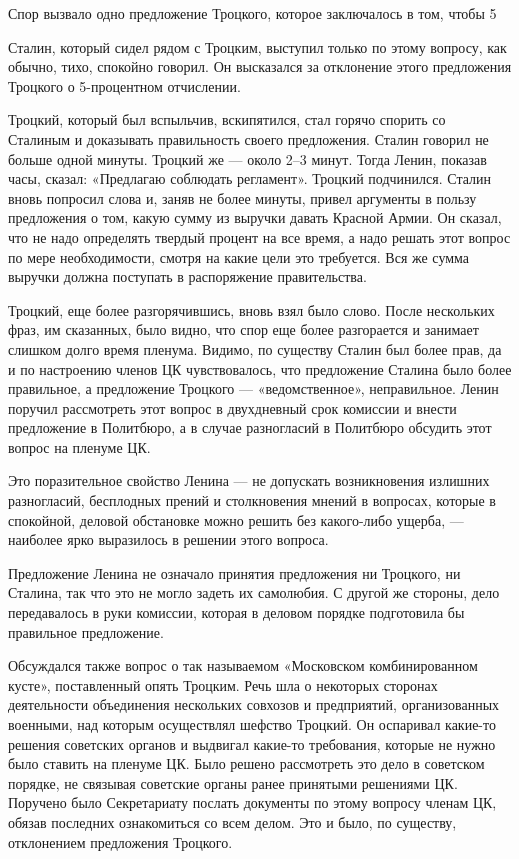 \documentclass[12pt, a4paper, openany]{book}
\begin{document}
Спор вызвало одно предложение Троцкого, которое заключалось в том, чтобы 5 %

Сталин, который сидел рядом с Троцким, выступил только по этому вопросу, как обычно, тихо, спокойно говорил. Он высказался за отклонение этого предложения Троцкого о 5-процентном отчислении.

Троцкий, который был вспыльчив, вскипятился, стал горячо спорить со Сталиным и доказывать правильность своего предложения. Сталин говорил не больше одной минуты. Троцкий же — около 2–3 минут. Тогда Ленин, показав часы, сказал: «Предлагаю соблюдать регламент». Троцкий подчинился. Сталин вновь попросил слова и, заняв не более минуты, привел аргументы в пользу предложения о том, какую сумму из выручки давать Красной Армии. Он сказал, что не надо определять твердый процент на все время, а надо решать этот вопрос по мере необходимости, смотря на какие цели это требуется. Вся же сумма выручки должна поступать в распоряжение правительства.

Троцкий, еще более разгорячившись, вновь взял было слово. После нескольких фраз, им сказанных, было видно, что спор еще более разгорается и занимает слишком долго время пленума. Видимо, по существу Сталин был более прав, да и по настроению членов ЦК чувствовалось, что предложение Сталина было более правильное, а предложение Троцкого — «ведомственное», неправильное. Ленин поручил рассмотреть этот вопрос в двухдневный срок комиссии и внести предложение в Политбюро, а в случае разногласий в Политбюро обсудить этот вопрос на пленуме ЦК.

Это поразительное свойство Ленина — не допускать возникновения излишних разногласий, бесплодных прений и столкновения мнений в вопросах, которые в спокойной, деловой обстановке можно решить без какого-либо ущерба, — наиболее ярко выразилось в решении этого вопроса.

Предложение Ленина не означало принятия предложения ни Троцкого, ни Сталина, так что это не могло задеть их самолюбия. С другой же стороны, дело передавалось в руки комиссии, которая в деловом порядке подготовила бы правильное предложение.

Обсуждался также вопрос о так называемом «Московском комбинированном кусте», поставленный опять Троцким. Речь шла о некоторых сторонах деятельности объединения нескольких совхозов и предприятий, организованных военными, над которым осуществлял шефство Троцкий. Он оспаривал какие-то решения советских органов и выдвигал какие-то требования, которые не нужно было ставить на пленуме ЦК. Было решено рассмотреть это дело в советском порядке, не связывая советские органы ранее принятыми решениями ЦК. Поручено было Секретариату послать документы по этому вопросу членам ЦК, обязав последних ознакомиться со всем делом. Это и было, по существу, отклонением предложения Троцкого.
\end{document}
